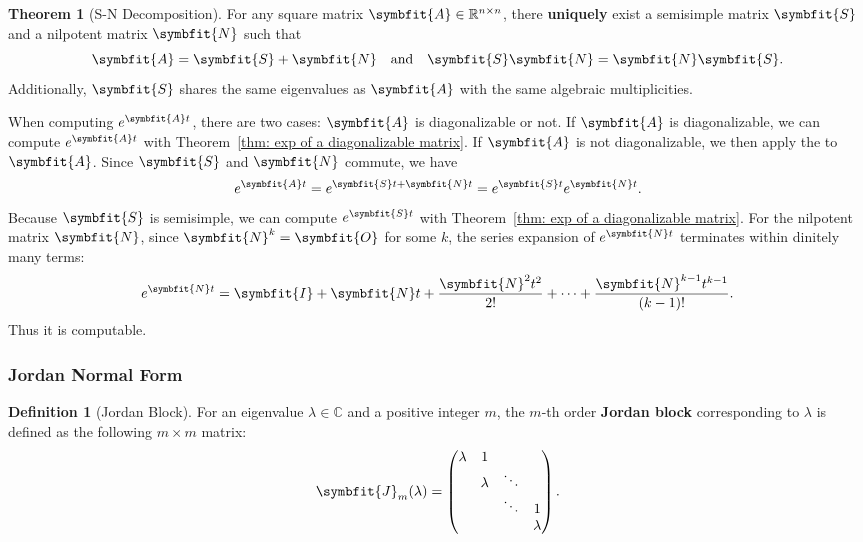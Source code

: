 \documentclass[10pt,UTF8]{article}
\newcommand{\mat}[1]{\symbfit{#1}}
\newenvironment{definitionBox}
{ \bigskip
  \begin{tcolorbox}[colback=blue!5!white,colframe=blue!75!black,parbox=false,before
  upper=\par,before lower=\par]}
  {
\end{tcolorbox}}
\newenvironment{theoremBox}
{ \bigskip
  \begin{tcolorbox}[colback=yellow!5!white,colframe=yellow!75!black,parbox=false,before
  upper=\par,before lower=\par]}
  {
\end{tcolorbox}}
\theoremstyle{definition}
\newtheorem{definition inner}{Definition}[section]
\newenvironment{definition}[1][]
{
  \begin{definitionBox}
  \begin{definition inner}[#1]\hfill\par}
    {
    \end{definition inner}
\end{definitionBox}}
\theoremstyle{definition}
\newtheorem{theorem inner}{Theorem}[section]
\newenvironment{theorem}[1][]
{
  \begin{theoremBox}
  \begin{theorem inner}[#1]\hfill\par}
    {
    \end{theorem inner}
\end{theoremBox}}
\theoremstyle{definition}
\newtheorem*{proof inner}{\textit{Proof}}
\theoremstyle{plain}
\newtheorem{tip inner}{Tip}[section]
\theoremstyle{remark}
\begin{document}
\begin{theorem}[S-N Decomposition]
  {}\label{thm: S-N Decomposition}
  For any square matrix \(\mat{A} \in \mathbb{R}^{n \times n}\),
  there \textbf{uniquely} exist a semisimple matrix \(\mat{S}\)
  and a nilpotent matrix \(\mat{N}\) such that
  \begin{equation*}
    \mat{A} = \mat{S} + \mat{N} \quad\text{and}\quad
    \mat{S} \mat{N} = \mat{N} \mat{S}.
  \end{equation*}
  Additionally, \(\mat{S}\) shares the same eigenvalues as \(\mat{A}\)
  with the same algebraic multiplicities.
\end{theorem}

When computing \(e^{\mat{A} t}\),
there are two cases:
\(\mat{A}\) is diagonalizable or not.
If \(\mat{A}\) is diagonalizable, we can compute
\(e^{\mat{A} t}\) with
Theorem~\ref{thm: exp of a diagonalizable matrix}.
If \(\mat{A}\) is not diagonalizable,
we then apply the 
to \(\mat{A}\).
Since \(\mat{S}\) and \(\mat{N}\) commute, we have
\begin{equation*}
  e^{\mat{A} t} = e^{\mat{S} t + \mat{N} t}
  = e^{\mat{S} t} e^{\mat{N} t}.
\end{equation*}
Because \(\mat{S}\) is semisimple, we can compute \(e^{\mat{S} t}\)
with Theorem~\ref{thm: exp of a diagonalizable matrix}.
For the nilpotent matrix \(\mat{N}\),
since \(\mat{N}^k = \mat{O}\) for some \(k\),
the series expansion of \(e^{\mat{N} t}\) terminates within dinitely many terms:
\begin{equation*}
  e^{\mat{N} t} = \mat{I} + \mat{N} t + \frac{\mat{N}^2 t^2}{2!} + \cdots
  + \frac{\mat{N}^{k-1} t^{k-1}}{(k-1)!}.
\end{equation*}
Thus it is computable.

\subsubsection{Jordan Normal Form}

\begin{definition}[Jordan Block]
  {}\label{def: Jordan Block}
  For an eigenvalue \(\lambda \in \mathbb{C}\) and a positive integer \(m\),
  the \(m\)-th order \textbf{Jordan block} corresponding to \(\lambda \) is
  defined as the following \(m \times m\) matrix:
  \begin{equation*}
    \mat{J}_m(\lambda) =
    \begin{pmatrix}
      \lambda & 1 & & \\ & \lambda & \ddots & \\ & & \ddots & 1 \\ &
      & & \lambda
    \end{pmatrix}.
  \end{equation*}
\end{definition}
\end{document}
